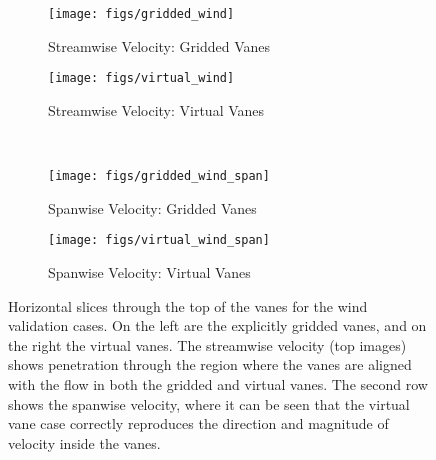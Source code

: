 \begin{figure}
  \begin{subfigure}{0.49\textwidth}
   \centering
   \texttt{[image: figs/gridded\_wind]}
   \caption{Streamwise Velocity: Gridded Vanes}
  \end{subfigure}
  \begin{subfigure}{0.49\textwidth}  
   \centering
   \texttt{[image: figs/virtual\_wind]}
   \caption{Streamwise Velocity: Virtual Vanes}
   \end{subfigure} \\
  \begin{subfigure}{0.49\textwidth}
   \centering
   \texttt{[image: figs/gridded\_wind\_span]}
   \caption{Spanwise Velocity: Gridded Vanes}
  \end{subfigure}
  \begin{subfigure}{0.49\textwidth}
   \centering
  \texttt{[image: figs/virtual\_wind\_span]}
   \caption{Spanwise Velocity: Virtual Vanes}
  \end{subfigure}
 \caption{Horizontal slices through the top of the vanes for the
 wind validation cases. On the left are the explicitly gridded vanes,
 and on the right the virtual vanes. The streamwise velocity (top
 images) shows penetration through the region where the vanes are aligned
 with the flow in both the gridded and virtual vanes. The second row
 shows the spanwise velocity, where it can be seen that the virtual vane
 case correctly reproduces the direction and magnitude of velocity
 inside the vanes.} 
 \label{fig:wind_val}
\end{figure}

